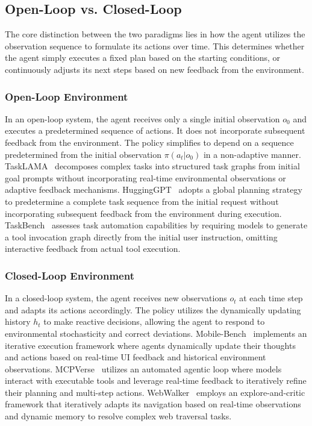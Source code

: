 \subsection{Open-Loop vs. Closed-Loop}
\label{attribute:Open-Loop vs. Closed-Loop}
The core distinction between the two paradigms lies in how the agent utilizes the observation sequence to formulate its actions over time. This determines whether the agent simply executes a fixed plan based on the starting conditions, or continuously adjusts its next steps based on new feedback from the environment.

\subsubsection{Open-Loop Environment}
In an open-loop system, the agent receives only a single initial observation $o_0$ and executes a predetermined sequence of actions. It does not incorporate subsequent feedback from the environment. The policy simplifies to depend on a sequence predetermined from the initial observation $\pi(a_t | o_0)$ in a non-adaptive manner. TaskLAMA~\cite{TaskLAMA} decomposes complex tasks into structured task graphs from initial goal prompts without incorporating real-time environmental observations or adaptive feedback mechanisms. HuggingGPT~\cite{HuggingGPT} adopts a global planning strategy to predetermine a complete task sequence from the initial request without incorporating subsequent feedback from the environment during execution. TaskBench~\cite{TaskBench} assesses task automation capabilities by requiring models to generate a tool invocation graph directly from the initial user instruction, omitting interactive feedback from actual tool execution.

\subsubsection{Closed-Loop Environment}
In a closed-loop system, the agent receives new observations $o_t$ at each time step and adapts its actions accordingly. The policy utilizes the dynamically updating history $h_t$ to make reactive decisions, allowing the agent to respond to environmental stochasticity and correct deviations. Mobile-Bench~\cite{Mobile-Bench} implements an iterative execution framework where agents dynamically update their thoughts and actions based on real-time UI feedback and historical environment observations. MCPVerse~\cite{MCPVerse} utilizes an automated agentic loop where models interact with executable tools and leverage real-time feedback to iteratively refine their planning and multi-step actions. WebWalker~\cite{WebWalker} employs an explore-and-critic framework that iteratively adapts its navigation based on real-time observations and dynamic memory to resolve complex web traversal tasks.

